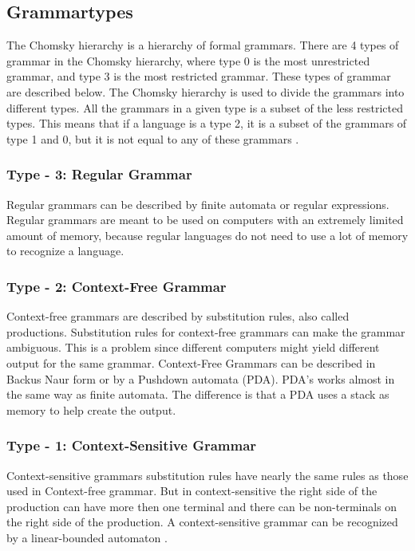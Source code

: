 \subsection{Grammartypes}
The Chomsky hierarchy is a hierarchy of formal grammars. There are 4 types of grammar in the Chomsky hierarchy, where type 0 is the most unrestricted grammar, and type 3 is the most restricted grammar. These types of grammar are described below. The Chomsky hierarchy is used to divide the grammars into different types. All the grammars in a given type is a subset of the less restricted types. This means that if a language is a type 2, it is a subset of the grammars of type 1 and 0, but it is not equal to any of these grammars \citep{Chomsky}.

\subsubsection{Type - 3: Regular Grammar}
Regular grammars can be described by finite automata or regular expressions. Regular grammars are meant to be used on computers with an extremely limited amount of memory, because regular languages do not need to use a lot of memory to recognize a language\citep{sipser}.

\subsubsection{Type - 2: Context-Free Grammar}
Context-free grammars are described by substitution rules, also called productions. Substitution rules for context-free grammars can make the grammar ambiguous.
This is a problem since different computers might yield different output for the same grammar.
Context-Free Grammars can be described in Backus Naur form or by a Pushdown automata (PDA). PDA's works almost in the same way as finite automata. The difference is that a PDA uses a stack as memory to help create the output\citep{sipser}. 

\subsubsection{Type - 1: Context-Sensitive Grammar}
Context-sensitive grammars substitution rules have nearly the same rules as those used in Context-free grammar. But in context-sensitive the right side of the production can have more then one terminal and there can be non-terminals on the right side of the production. A context-sensitive grammar can be recognized by a linear-bounded automaton \citep{ItLatToC}.

